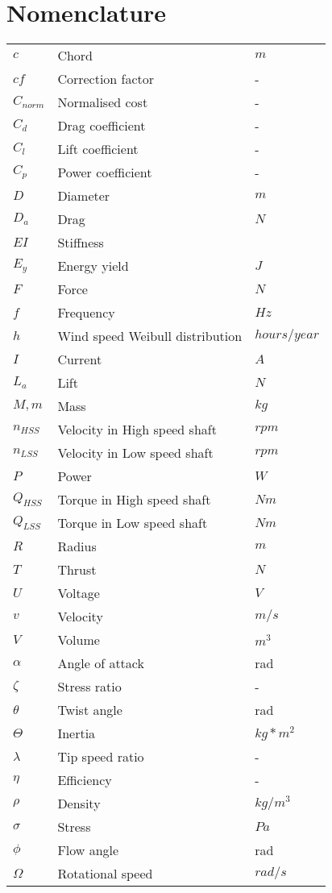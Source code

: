 \section*{Nomenclature}



\begin{tabular}{p{3cm} p{7cm} p{4cm}}

$c$ & Chord & $m$ \\
$cf$ & Correction factor & - \\
$C_{norm}$ & Normalised cost & - \\
$C_d$ & Drag coefficient & - \\
$C_l$ & Lift coefficient & - \\
$C_p$ & Power coefficient & - \\
$D$ & Diameter & $m$ \\
$D_a$ & Drag & $N$ \\
$EI$ & Stiffness & \\
$E_y$ & Energy yield & $J$ \\
$F$ & Force & $N$ \\
$f$ & Frequency & $Hz$ \\
$h$ & Wind speed Weibull distribution & $hours/year$ \\ 
$I$ & Current & $A$ \\
$L_a$ & Lift & $N$ \\
$M, m$ & Mass & $kg$ \\
$n_{HSS}$ & Velocity in High speed shaft & $rpm$ \\
$n_{LSS}$ & Velocity in Low speed shaft & $rpm$ \\
$P$  & Power  & $W$  \\
$Q_{HSS}$ & Torque in High speed shaft & $Nm$ \\
$Q_{LSS}$ & Torque in Low speed shaft & $Nm$ \\
$R$ & Radius & $m$ \\ 
$T$ & Thrust & $N$ \\
$U$ & Voltage & $V$ \\
$v$ & Velocity & $m/s$ \\
$V$ & Volume & $m^3$ \\

$\alpha$ & Angle of attack & rad \\
$\zeta$ & Stress ratio & - \\
$\theta$ & Twist angle & rad \\
$\Theta$ & Inertia & $kg*m^2$ \\
$\lambda$ & Tip speed ratio & - \\
$\eta$ & Efficiency & - \\
$\rho$ & Density & $kg/m^3$ \\
$\sigma$ & Stress & $Pa$ \\
$\phi$ & Flow angle & rad \\
$\Omega$ & Rotational speed & $rad/s$ \\

\end{tabular}




